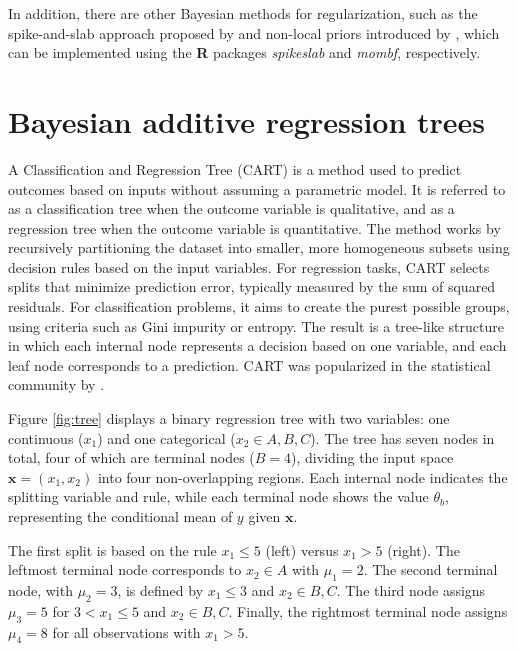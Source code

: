 In addition, there are other Bayesian methods for regularization, such as the spike-and-slab approach proposed by \cite{Ishwaran2005} and non-local priors introduced by \cite{johnson2012bayesian}, which can be implemented using the \textbf{R} packages \textit{spikeslab} and \textit{mombf}, respectively.



\section{Bayesian additive regression trees}\label{sec13_3}

A Classification and Regression Tree (CART) is a method used to predict outcomes based on inputs without assuming a parametric model. It is referred to as a classification tree when the outcome variable is qualitative, and as a regression tree when the outcome variable is quantitative. The method works by recursively partitioning the dataset into smaller, more homogeneous subsets using decision rules based on the input variables. For regression tasks, CART selects splits that minimize prediction error, typically measured by the sum of squared residuals. For classification problems, it aims to create the purest possible groups, using criteria such as Gini impurity or entropy. The result is a tree-like structure in which each internal node represents a decision based on one variable, and each leaf node corresponds to a prediction. CART was popularized in the statistical community by \cite{breiman1984classification}.

Figure \ref{fig:tree} displays a binary regression tree with two variables: one continuous ($x_1$) and one categorical ($x_2 \in {A, B, C}$). The tree has seven nodes in total, four of which are terminal nodes ($B = 4$), dividing the input space $\mathbf{x} = (x_1, x_2)$ into four non-overlapping regions. Each internal node indicates the splitting variable and rule, while each terminal node shows the value $\theta_b$, representing the conditional mean of $y$ given $\mathbf{x}$.

The first split is based on the rule $x_1 \leq 5$ (left) versus $x_1 > 5$ (right). The leftmost terminal node corresponds to $x_2 \in {A}$ with $\mu_1 = 2$. The second terminal node, with $\mu_2 = 3$, is defined by $x_1 \leq 3$ and $x_2 \in {B, C}$. The third node assigns $\mu_3 = 5$ for $3 < x_1 \leq 5$ and $x_2 \in {B, C}$. Finally, the rightmost terminal node assigns $\mu_4 = 8$ for all observations with $x_1 > 5$.

